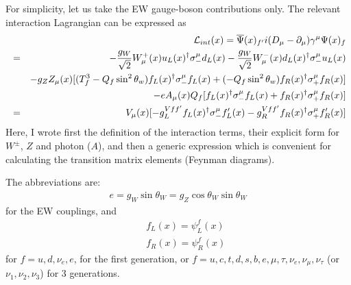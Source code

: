 \documentclass[12pt]{article}
\def\del{{\partial}}
\def\dgr{\dagger}
\begin{document}
For simplicity, let us take the EW gauge-boson contributions only.
The relevant interaction Lagrangian can be expressed as
\begin{eqnarray}
   && {\cal L}_{int}(x)
    = {\overline \Psi}(x)_{f'} i(D_\mu -\del_\mu) \gamma^\mu \Psi(x)_f \\ 
    &=& -\frac{g_W}{\sqrt 2} W^+_\mu(x) u_L(x)^\dgr \sigma_-^\mu d_L(x)
    -\frac{g_W}{\sqrt 2} W^-_\mu(x)  d_L(x)^\dgr \sigma_-^\mu u_L(x)
    \nonumber \\&&-g_Z Z_\mu(x) [(T^3_f-Q_f\sin^2\theta_w) f_L(x)^\dgr \sigma_-^\mu f_L(x)  + (-Q_f\sin^2\theta_w) f_R(x)^\dgr \sigma_+^\mu f_R(x) ]
    \nonumber \\ &&  -e A_\mu(x)  Q_f   [ f_L(x)^\dgr \sigma_-^\mu f_L(x)
                                  +f_R(x)^\dgr \sigma_+^\mu f_R(x) ]\\
    &=& V_\mu(x)     [  -g_L^{Vff'} f_L(x)^\dgr \sigma_-^\mu f'_L(x)
                    -g_R^{Vff'} f_R(x)^\dgr \sigma_+^\mu f'_R(x) ] \label{eq.18_13}
\end{eqnarray}
Here, I wrote first the definition of the interaction terms, their
explicit form for $W^\pm$, $Z$ and photon ($A$), and then a generic
expression which is convenient for calculating the transition
matrix elements (Feynman diagrams).

The abbreviations are:
\begin{eqnarray}
    e   = g_W \sin\theta_W = g_Z \cos\theta_W \sin\theta_W \label{eq.18_14}
\end{eqnarray}  
for the EW couplings, and
\begin{eqnarray}
    &&f_L(x) = \psi_L^f(x) \label{eq.18_15a} \\
    &&f_R(x) = \psi_R^f(x) \label{eq.18_15b}
\end{eqnarray}
for $f = u, d, \nu_e, e$, for the first generation,
or  $f = u,c,t, d,s,b, e,\mu,\tau, \nu_e,\nu_\mu,\nu_\tau$ (or $\nu_1,\nu_2,\nu_3$)
for 3 generations.
\end{document}
